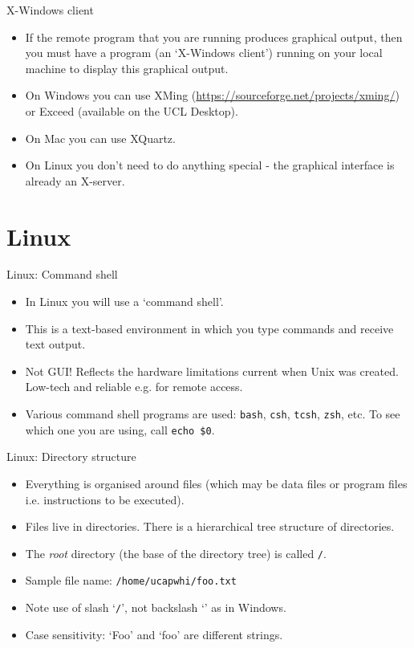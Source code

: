 \documentclass{beamer}
\newcommand{\command}[1]{\colorbox{light-gray}{\texttt{#1}}}
\newcommand{\filename}[1]{\colorbox{light-green}{\texttt{#1}}}
\begin{document}
\begin{frame}{X-Windows client}
  \begin{itemize}
    \item If the remote program that you are running produces graphical output, then you must have a program (an `X-Windows client') running on your local machine to display this graphical output.
    \item On Windows you can use XMing (\url{https://sourceforge.net/projects/xming/}) or Exceed (available on the UCL Desktop).
    \item On Mac you can use XQuartz.
    \item On Linux you don't need to do anything special - the graphical interface is already an X-server.
  \end{itemize}
\end{frame}


\section{Linux}

\begin{frame}{Linux: Command shell}
  \begin{itemize}
    \item{In Linux you will use a `command shell'.}
    \item{This is a text-based environment in which you type commands and receive text output.}
    \item{Not GUI! Reflects the hardware limitations current when Unix was created. Low-tech and reliable e.g. for remote access.}
    \item{Various command shell programs are used: \command{bash}, \command{csh}, \command{tcsh}, \command{zsh}, etc. To see which one you are using, call \command{echo \$0}.}
   \end{itemize}
\end{frame}

\begin{frame}{Linux: Directory structure}
  \begin{itemize}
    \item{Everything is organised around files (which may be data files or program files i.e. instructions to be executed).}
    \item{Files live in directories. There is a hierarchical tree structure of directories.}
    \item{The \textit{root} directory (the base of the directory tree) is called \filename{/}}.
    \item{Sample file name: \filename{/home/ucapwhi/foo.txt}}
    \item{Note use of slash `\texttt{/}', not backslash `\texttt{}' as in Windows.}
    \item{Case sensitivity: `Foo' and `foo' are different strings.}
  \end{itemize}
\end{frame}
\end{document}
